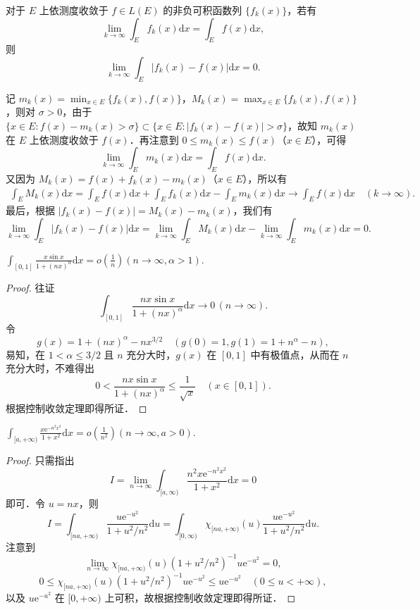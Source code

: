 \documentclass[../../main.tex]{subfiles}%
\begin{document}
\begin{remark}
对于 \( E \) 上依测度收敛于 \( f \in L(E) \) 的非负可积函数列 \( \{ f_k(x) \} \)，若有
\[
\lim_{k \to \infty} \int_E f_k(x) \mathrm{d}x = \int_E f(x) \mathrm{d}x,
\]
则
\[
\lim_{k \to \infty} \int_E |f_k(x) - f(x)| \mathrm{d}x = 0.
\]

记 \( m_k(x) = \min_{x \in E} \{ f_k(x), f(x) \} \)，\( M_k(x) = \max_{x \in E} \{ f_k(x), f(x) \} \)，则对 \( \sigma > 0 \)，由于 \( \{ x \in E : f(x) - m_k(x) > \sigma \} \subset \{ x \in E : |f_k(x) - f(x)| > \sigma \} \)，故知 \( m_k(x) \) 在 \( E \) 上依测度收敛于 \( f(x) \)．再注意到 \( 0 \leqslant m_k(x) \leqslant f(x) \)（\( x \in E \)），可得
\[
\lim_{k \to \infty} \int_E m_k(x) \mathrm{d}x = \int_E f(x) \mathrm{d}x.
\]
又因为 \( M_k(x) = f(x) + f_k(x) - m_k(x) \)（\( x \in E \)），所以有
\begin{align*}
\int_E M_k(x) \mathrm{d}x = \int_E f(x) \mathrm{d}x + \int_E f_k(x) \mathrm{d}x - \int_E m_k(x) \mathrm{d}x 
\to \int_E f(x) \mathrm{d}x \quad (k \to \infty).
\end{align*}
最后，根据 \( |f_k(x) - f(x)| = M_k(x) - m_k(x) \)，我们有
\[
\lim_{k \to \infty} \int_E |f_k(x) - f(x)| \mathrm{d}x = \lim_{k \to \infty} \int_E M_k(x) \mathrm{d}x - \lim_{k \to \infty} \int_E m_k(x) \mathrm{d}x = 0.
\]
\end{remark}

\begin{example}
$\int_{[0,1]} \frac{x\sin x}{1 + (nx)^\alpha} \mathrm{d}x = o\left( \frac{1}{n} \right) (n \to \infty, \alpha > 1).$
\end{example}
\begin{proof}
往证
\[
\int_{[0,1]} \frac{nx\sin x}{1 + (nx)^\alpha} \mathrm{d}x \to 0 \, (n \to \infty).
\]
令
\[
g(x) = 1 + (nx)^\alpha - nx^{3/2} \quad (g(0) = 1, g(1) = 1 + n^\alpha - n),
\]
易知，在 \(1 < \alpha \leqslant 3/2\) 且 \(n\) 充分大时，\(g(x)\) 在 \([0,1]\) 中有极值点，从而在 \(n\) 充分大时，不难得出
\[
0 < \frac{nx\sin x}{1 + (nx)^\alpha} \leqslant \frac{1}{\sqrt{x}} \quad (x \in [0,1]).
\]
根据控制收敛定理即得所证．
\end{proof}

\begin{example}
$\int_{[a, +\infty)} \frac{x\text{e}^{-n^2 x^2}}{1 + x^2} \mathrm{d}x = o\left( \frac{1}{n^2} \right) (n \to \infty, a > 0).$
\end{example}
\begin{proof}
只需指出
\[
I = \lim_{n \to \infty} \int_{[a, \infty)} \frac{n^2 x\text{e}^{-n^2 x^2}}{1 + x^2} \mathrm{d}x = 0
\]
即可．令 \(u = nx\)，则
\[
I = \int_{[na, +\infty)} \frac{u\text{e}^{-u^2}}{1 + u^2 / n^2} \mathrm{d}u = \int_{[0, \infty)} \chi_{[na, +\infty)}(u) \frac{u\text{e}^{-u^2}}{1 + u^2 / n^2} \mathrm{d}u.
\]
注意到
\[
\lim_{n \to \infty} \chi_{[na, +\infty)}(u) (1 + u^2 / n^2)^{-1} u\text{e}^{-u^2} = 0,
\]
\[
0 \leqslant \chi_{[na, +\infty)}(u) (1 + u^2 / n^2)^{-1} u\text{e}^{-u^2} \leqslant u\text{e}^{-u^2} \quad (0 \leqslant u < +\infty),
\]
以及 \(u\text{e}^{-u^2}\) 在 \([0, +\infty)\) 上可积，故根据控制收敛定理即得所证．
\end{proof}
\end{document}
